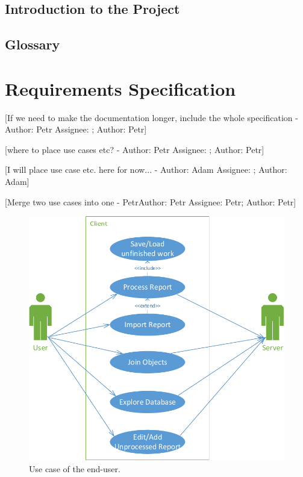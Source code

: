 \documentclass[12pt,a4paper]{report}
\makeatletter
\newcommand{\comment}[3][\@empty]{
  {\color{magenta}[#3 - }
  {\color{green}\ifx\@empty#1\relax Author: #2 \else Assignee: #1; Author: #2\fi}{\color{magenta}]}
}
\makeatother
\begin{document}
\section{Introduction to the Project}



\section{Glossary}


\chapter{Requirements Specification}
\comment{Petr}{If we need to make the documentation longer, include the whole specification}


\comment{Petr}{where to place use cases etc?}

\comment{Adam}{I will place use case etc. here for now...}

\comment[Petr]{Petr}{Merge two use cases into one}

\begin{figure}[!htb]
        \centering
        \includegraphics[width=\textwidth]{Images/UseCase1}
        \caption{Use case of the end-user.}
        \label{fig:UseCase1}
\end{figure}
\end{document}
